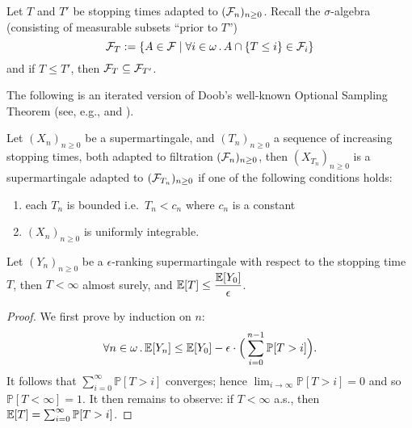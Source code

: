 Let $T$ and $T'$ be stopping times adapted to $(\mathcal{F}_n)_{n \geq 0}$.
Recall the $\sigma$-algebra (consisting of measurable subsets ``prior to $T$'')
\[
\mathcal{F}_T := \{A \in \mathcal{F} \mid \forall i \in \omega \, . \, A \cap \{T \leq i\} \in \mathcal{F}_i\}
\]
and if $T \leq T'$, then $\mathcal{F}_{T} \subseteq \mathcal{F}_{T'}$.

The following is an iterated version of Doob's well-known Optional Sampling Theorem (see, e.g., \cite[\S 6.7]{AshDD00} and \cite[Theorem 7.2]{DBLP:conf/popl/FioritiH15}).
\begin{theorem}
\label{thm:optional sampling}
Let $(X_n)_{n \geq 0}$ be a supermartingale, and $(T_n)_{n \geq 0}$ a sequence of increasing stopping times, both adapted to filtration $(\mathcal{F}_n)_{n \geq 0}$, then $(X_{T_n})_{n \geq 0}$ is a supermartingale adapted to $(\mathcal{F}_{T_n})_{n \geq 0}$ if one of the following conditions holds:
\begin{enumerate}
\item each $T_n$ is bounded i.e.~$T_n < c_n$ where $c_n$ is a constant
\item $(X_n)_{n \geq 0}$ is uniformly integrable.
\end{enumerate}
\end{theorem}

\begin{lemma}%
\label{lem:rank-PAST}
Let $(Y_n)_{n \geq 0}$ be a $\epsilon$-ranking supermartingale with respect to the stopping time $T$, then $T < \infty$ almost surely, and $\mathbb{E}[T] \leq \dfrac{\mathbb{E}[Y_0]}{\epsilon}$.
\end{lemma}

\begin{proof}
We first prove by induction on $n$: 
\[
\forall n \in \omega \, . \, \mathbb{E}[Y_n] \leq \mathbb{E}[Y_0] - \epsilon \cdot \Big(\sum_{i=0}^{n-1} \mathbb{P}[T > i]\Big).
\]
It follows that $\sum_{i=0}^{\infty} \mathbb{P}[T > i]$ converges; hence $\lim_{i \to \infty} \mathbb{P}[T > i] = 0$ and so $\mathbb{P}[T < \infty] = 1$.
It then remains to observe: if $T < \infty$ a.s., then $\mathbb{E}[T] = \sum^\infty_{i=0} \mathbb{P}[T > i]$.
\end{proof}


